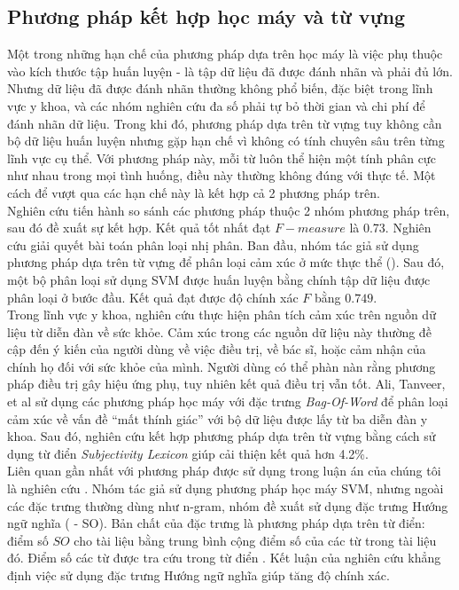 \subsection{Phương pháp kết hợp học máy và từ vựng}
Một trong những hạn chế của phương pháp dựa trên học máy là việc phụ thuộc vào kích thước tập huấn luyện - là tập dữ liệu đã được đánh nhãn và phải đủ lớn. Nhưng dữ liệu đã được đánh nhãn thường không phổ biến, đặc biệt trong lĩnh vực y khoa, và các nhóm nghiên cứu đa số phải tự bỏ thời gian và chi phí để đánh nhãn dữ liệu. Trong khi đó, phương pháp dựa trên từ vựng tuy không cần bộ dữ liệu huấn luyện nhưng gặp hạn chế vì không có tính chuyên sâu trên từng lĩnh vực cụ thể. Với phương pháp này, mỗi từ luôn thể hiện một tính phân cực như nhau trong mọi tình huống, điều này thường không đúng với thực tế. Một cách để vượt qua các hạn chế này là kết hợp cả 2 phương pháp trên.\\

Nghiên cứu \cite{gonccalves2013comparing} tiến hành so sánh các phương pháp thuộc 2 nhóm phương pháp trên, sau đó đề xuất sự kết hợp. Kết quả tốt nhất đạt $F-measure$ là 0.73. Nghiên cứu \cite{Zhang2011} giải quyết bài toán phân loại nhị phân. Ban đầu, nhóm tác giả sử dụng phương pháp dựa trên từ vựng để phân loại cảm xúc ở mức thực thể (). Sau đó, một bộ phân loại sử dụng SVM được huấn luyện bằng chính tập dữ liệu được phân loại ở bước đầu. Kết quả đạt được độ chính xác $F$ bằng $0.749$.\\

Trong lĩnh vực y khoa, nghiên cứu \cite{ali2013can} thực hiện phân tích cảm xúc trên nguồn dữ liệu từ diễn đàn về sức khỏe. Cảm xúc trong các nguồn dữ liệu này thường đề cập đến ý kiến của người dùng về việc điều trị, về bác sĩ, hoặc cảm nhận của chính họ đối với sức khỏe của mình. Người dùng có thể phàn nàn rằng phương pháp điều trị gây hiệu ứng phụ, tuy nhiên kết quả điều trị vẫn tốt. Ali, Tanveer, et al \cite{ali2013can} sử dụng các phương pháp học máy với đặc trưng \textit{Bag-Of-Word} để phân loại cảm xúc về vấn đề ``mất thính giác'' với bộ dữ liệu được lấy từ ba diễn đàn y khoa\footnotemark. Sau đó, nghiên cứu kết hợp phương pháp dựa trên từ vựng bằng cách sử dụng từ điển \textit{Subjectivity Lexicon} giúp cải thiện kết quả hơn 4.2\%. \\

Liên quan gần nhất với phương pháp được sử dụng trong luận án của chúng tôi là nghiên cứu \cite{sarker2011outcome}. Nhóm tác giả sử dụng phương pháp học máy SVM, nhưng ngoài các đặc trưng thường dùng như n-gram, nhóm đề xuất sử dụng đặc trưng Hướng ngữ nghĩa ( - SO). Bản chất của đặc trưng là phương pháp dựa trên từ điển: điểm số $SO$ cho tài liệu bằng trung bình cộng điểm số của các từ trong tài liệu đó. Điểm số các từ được tra cứu trong từ điển . Kết luận của nghiên cứu khẳng định việc sử dụng đặc trưng Hướng ngữ nghĩa giúp tăng độ chính xác.